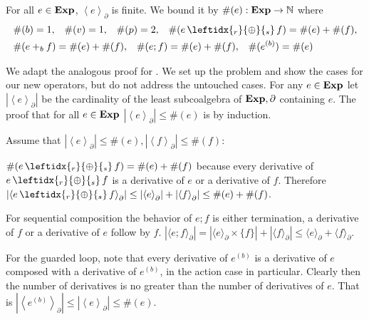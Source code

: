 \documentclass[a4paper,UKenglish,cleveref, autoref, thm-restate]{lipics-v2021}
\newcommand{\Exp}{\textbf{\upshape{Exp}}}
\newcommand{\WC}[2]{\,\leftidx{_{#1}}{{\oplus}}{_{#2}}\,}
\newcommand{\probgkat}{\textsf{\upshape{ProbGKAT}}\xspace}
\theoremstyle{plain}\newtheoremrep{thm}{Theorem}[section]
\begin{document}
	\begin{lemrep}
		For all $e \in \Exp$, $\left\langle e\right\rangle_\partial$ is finite. We bound it by $\#(e): \Exp \to \mathbb{N}$ where \label{lem7}
		\begin{align*}
			&\#(b) = 1,\;\;\;\#(v) = 1,\;\;\; \#(p) = 2,\;\;\; \#(e \WC{r}{s} f) = \#(e)+\#(f),\\
			&\#(e +_b f) = \#(e)+\#(f),\;\;\; \#(e;f) = \#(e)+\#(f),\;\;\; \#(e^{(b)}) = \#(e)
		\end{align*}
	\end{lemrep}
	\begin{appendixproof}
		We adapt the analogous proof for \probgkat \cite{rozowski2023probabilistic}. We set up the problem and show the cases for our new operators, but do not address the untouched cases. For any $e \in \Exp$ let $\left|\left\langle e\right\rangle_\partial\right|$ be the cardinality of the least subcoalgebra of $\Exp, \partial$ containing $e$. The proof that for all $e \in \Exp$ $\left|\left\langle e\right\rangle_\partial\right| \leq \#(e)$ is by induction.
		
		Assume that $\left|\left\langle e\right\rangle_\partial\right| \leq \#(e), \left|\left\langle f\right\rangle_\partial\right| \leq \#(f)$:
		
		$\#(e \WC{r}{s} f) = \#(e) +\#(f)$ because every derivative of $e \WC{r}{s} f$ is a derivative of $e$ or a derivative of $f$. Therefore $\left|\left\langle e\WC{r}{s}f \right\rangle_\partial\right| \leq \left|\left\langle e\right\rangle_\partial\right|+\left|\left\langle f \right\rangle_\partial\right| \leq \#(e) +\#(f)$.
		
		For sequential composition the behavior of $e;f$ is either termination, a derivative of $f$ or a derivative of $e$ follow by $f$. $|\langle e;f\rangle_\partial| = |\langle e\rangle_\partial \times \{f\}| + |\langle f \rangle_\partial| \leq \langle e\rangle_\partial + \langle f\rangle_\partial$.
		
		For the guarded loop, note that every derivative of $e^{(b)}$ is a derivative of $e$ composed with a derivative of $e^{(b)}$, in the action case in particular. Clearly then the number of derivatives is no greater than the number of derivatives of $e$. That is $\left|\left\langle e^{(b)}\right\rangle_\partial\right| \leq \left|\left\langle e\right\rangle_\partial\right| \leq \#(e)$.
	\end{appendixproof}
\end{document}
